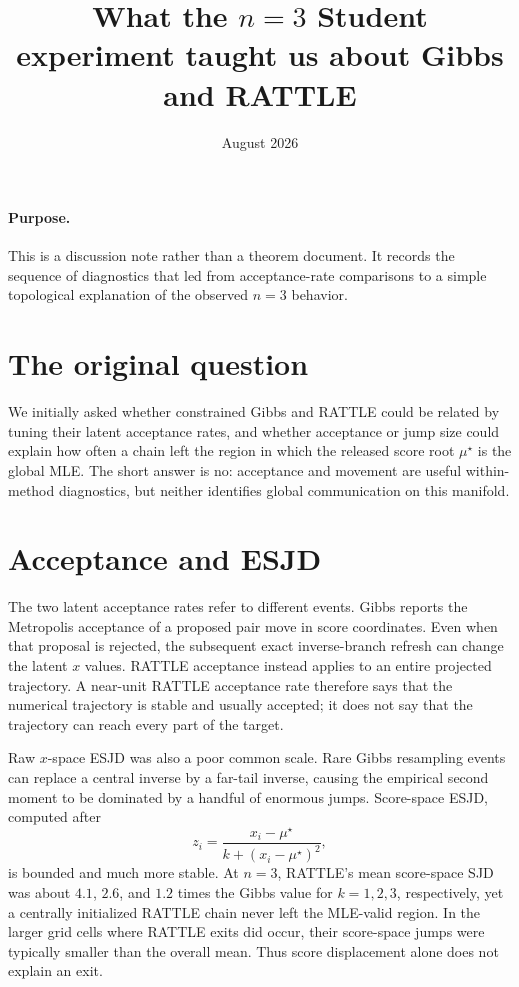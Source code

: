 \documentclass[11pt]{article}
\title{What the $n=3$ Student experiment taught us about Gibbs and RATTLE}
\author{}
\date{August 2026}
\begin{document}
\maketitle

\paragraph{Purpose.}
This is a discussion note rather than a theorem document.  It records the
sequence of diagnostics that led from acceptance-rate comparisons to a simple
topological explanation of the observed $n=3$ behavior.

\section{The original question}

We initially asked whether constrained Gibbs and RATTLE could be related by
tuning their latent acceptance rates, and whether acceptance or jump size could
explain how often a chain left the region in which the released score root
$\mu^\star$ is the global MLE.  The short answer is no: acceptance and movement
are useful within-method diagnostics, but neither identifies global
communication on this manifold.

\section{Acceptance and ESJD}

The two latent acceptance rates refer to different events.  Gibbs reports the
Metropolis acceptance of a proposed pair move in score coordinates.  Even when
that proposal is rejected, the subsequent exact inverse-branch refresh can
change the latent $x$ values.  RATTLE acceptance instead applies to an entire
projected trajectory.  A near-unit RATTLE acceptance rate therefore says that
the numerical trajectory is stable and usually accepted; it does not say that
the trajectory can reach every part of the target.

Raw $x$-space ESJD was also a poor common scale.  Rare Gibbs resampling events
can replace a central inverse by a far-tail inverse, causing the empirical
second moment to be dominated by a handful of enormous jumps.  Score-space
ESJD, computed after
\[
z_i=\frac{x_i-\mu^\star}{k+(x_i-\mu^\star)^2},
\]
is bounded and much more stable.  At $n=3$, RATTLE's mean score-space SJD was
about $4.1$, $2.6$, and $1.2$ times the Gibbs value for $k=1,2,3$, respectively,
yet a centrally initialized RATTLE chain never left the MLE-valid region.  In
the larger grid cells where RATTLE exits did occur, their score-space jumps
were typically smaller than the overall mean.  Thus score displacement alone
does not explain an exit.
\end{document}
